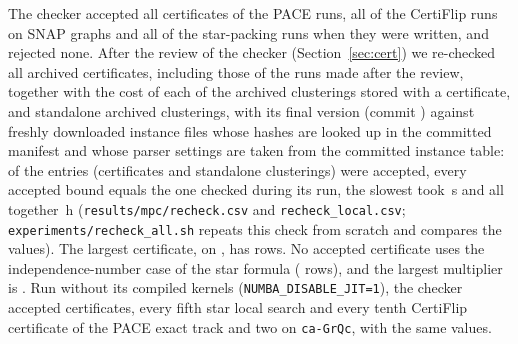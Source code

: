 The checker accepted all \numCertPaceOk{} certificates of the PACE runs, all
\numCertSnapOk{} of the CertiFlip runs on SNAP graphs and all
\numCertPackOk{} of the star-packing runs when they were written, and
rejected none.  After the review of the checker (Section~\ref{sec:cert}) we
re-checked all \numRecheckCerts{} archived certificates, including those of
the runs made after the review, together with the cost of each of the
\numRecheckPaired{} archived clusterings stored with a certificate, and
\numRecheckLabels{} standalone archived clusterings, with its final version (commit \texttt{\numCheckerCommit}) against freshly
downloaded instance files whose hashes are looked up in the committed
manifest and whose parser settings are taken from the committed instance
table: \numRecheckOk{} of the \numRecheckN{} entries (certificates and
standalone clusterings) were accepted, every accepted
bound equals the one checked during its run, the slowest took
\numRecheckMax{}\,s and all together \numRecheckTotal{}\,h
(\texttt{results/mpc/recheck.csv} and \texttt{recheck\_local.csv};
\texttt{experiments/recheck\_all.sh} repeats this check from scratch and
compares the values).  The
largest certificate, on \texttt{\numCheckMaxGraph}, has \numCheckMaxRows{}
rows.  No accepted certificate uses the independence-number case of the
star formula (\numAlphaRows{} rows), and the largest multiplier is
\numMaxY{}.  Run without its compiled kernels
(\texttt{NUMBA\_DISABLE\_JIT=1}), the checker accepted \numNojitN{}
certificates, every fifth star local search and every tenth CertiFlip
certificate of the PACE exact track and two on \texttt{ca-GrQc}, with the
same values.
